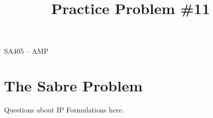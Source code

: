 \documentclass[11pt]{article}
\makeatletter
\theoremstyle{definition}
\renewcommand{\maketitle}{
  \noindent SA405 -- AMP \hfill\\

  \begin{center}\Large{\textbf{\@title}}\end{center}
}
\makeatother
\begin{document}
  
\title{Practice Problem \#11}

\maketitle



\section{The Sabre Problem}


Questions about IP Formulations here.
\end{document}

